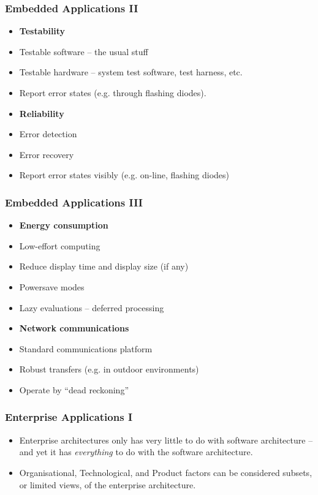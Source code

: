 \documentclass[10pt]{beamer}
\def\subitem{\item[\hspace{1.5cm} -]}
\begin{document}
\begin{frame}[t]
\frametitle{Embedded Applications II}
\begin{itemize}
\item {\bf Testability} %
\subitem Testable software -- the usual stuff
\subitem Testable hardware -- system test software, test harness, etc.
\subitem Report error states (e.g. through flashing diodes).
\item {\bf Reliability} %
\subitem Error detection
\subitem Error recovery
\subitem Report error states visibly (e.g. on-line, flashing diodes)
\end{itemize}
\end{frame}

\begin{frame}[t]
\frametitle{Embedded Applications III}
\begin{itemize}
\item {\bf Energy consumption} %
\subitem Low-effort computing
\subitem Reduce display time and display size (if any)
\subitem Powersave modes
\subitem Lazy evaluations -- deferred processing
\item {\bf Network communications} %
\subitem Standard communications platform
\subitem Robust transfers (e.g. in outdoor environments)
\subitem Operate by ``dead reckoning''
\end{itemize}
\end{frame}

\begin{frame}[t]
\frametitle{Enterprise Applications I}
\begin{itemize}
\item Enterprise architectures only has very little to do with software architecture -- and yet it has \emph{everything} to do with the software architecture.
\item Organisational, Technological, and Product factors can be considered subsets, or limited views, of the enterprise architecture.
\end{itemize}
\end{frame}
\end{document}
